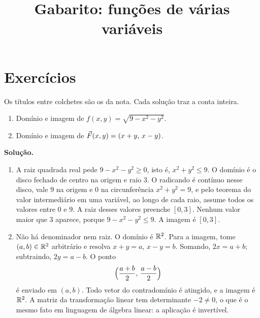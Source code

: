 \documentclass[11pt,a4paper]{article}
\title{Gabarito: funções de várias variáveis}
\author{}
\date{}
\begin{document}
\maketitle
\tableofcontents

\section{Exercícios}

Os títulos entre colchetes são os da nota. Cada solução traz a conta inteira.

\begin{exercicio}
\begin{enumerate}[label=\alph*)]
\item Domínio e imagem de $f(x,y)=\sqrt{9-x^2-y^2}$.
\item Domínio e imagem de $\vec{F}(x,y)=(x+y,\,x-y)$.
\end{enumerate}

\textbf{Solução.}
\begin{enumerate}[label=\alph*)]
\item A raiz quadrada real pede $9-x^2-y^2\ge 0$, isto é, $x^2+y^2\le 9$. O domínio é o disco fechado de centro na origem e raio $3$. O radicando é contínuo nesse disco, vale $9$ na origem e $0$ na circunferência $x^2+y^2=9$, e pelo teorema do valor intermediário em uma variável, ao longo de cada raio, assume todos os valores entre $0$ e $9$. A raiz desses valores preenche $[0,3]$. Nenhum valor maior que $3$ aparece, porque $9-x^2-y^2\le 9$. A imagem é $[0,3]$.

\item Não há denominador nem raiz. O domínio é $\mathbb{R}^2$. Para a imagem, tome $(a,b)\in\mathbb{R}^2$ arbitrário e resolva $x+y=a$, $x-y=b$. Somando, $2x=a+b$; subtraindo, $2y=a-b$. O ponto
\[
\Bigl(\frac{a+b}{2},\,\frac{a-b}{2}\Bigr)
\]
é enviado em $(a,b)$. Todo vetor do contradomínio é atingido, e a imagem é $\mathbb{R}^2$. A matriz da transformação linear tem determinante $-2\neq 0$, o que é o mesmo fato em linguagem de álgebra linear: a aplicação é invertível.
\end{enumerate}
\end{exercicio}
\end{document}
